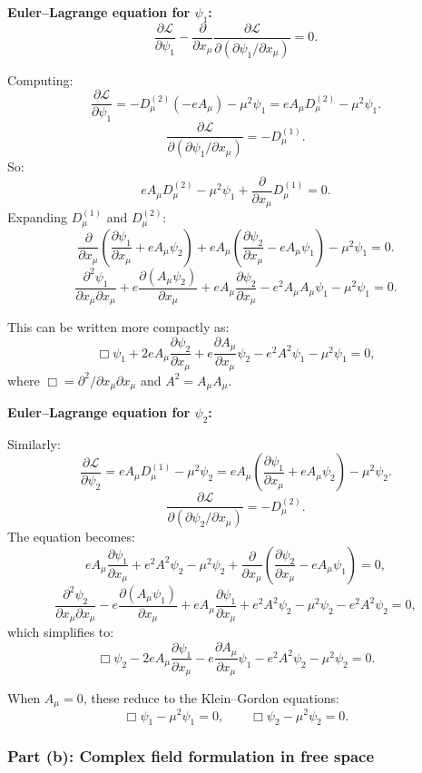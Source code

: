 \documentclass[12pt]{article}
\begin{document}
\medskip
\noindent\textbf{Euler--Lagrange equation for $\psi_1$:}
\[
  \frac{\partial\mathscr{L}}{\partial\psi_1} - \frac{\partial}{\partial x_\mu}\frac{\partial\mathscr{L}}{\partial(\partial\psi_1/\partial x_\mu)} = 0.
\]

Computing:
\[
  \frac{\partial\mathscr{L}}{\partial\psi_1} = -D_\mu^{(2)}(-eA_\mu) - \mu^2\psi_1 = eA_\mu D_\mu^{(2)} - \mu^2\psi_1.
\]
\[
  \frac{\partial\mathscr{L}}{\partial(\partial\psi_1/\partial x_\mu)} = -D_\mu^{(1)}.
\]
So:
\[
  eA_\mu D_\mu^{(2)} - \mu^2\psi_1 + \frac{\partial}{\partial x_\mu}D_\mu^{(1)} = 0.
\]
Expanding $D_\mu^{(1)}$ and $D_\mu^{(2)}$:
\[
  \frac{\partial}{\partial x_\mu}\left(\frac{\partial\psi_1}{\partial x_\mu} + eA_\mu\psi_2\right) + eA_\mu\left(\frac{\partial\psi_2}{\partial x_\mu} - eA_\mu\psi_1\right) - \mu^2\psi_1 = 0.
\]
\[
  \boxed{\frac{\partial^2\psi_1}{\partial x_\mu\partial x_\mu} + e\frac{\partial(A_\mu\psi_2)}{\partial x_\mu} + eA_\mu\frac{\partial\psi_2}{\partial x_\mu} - e^2 A_\mu A_\mu\psi_1 - \mu^2\psi_1 = 0.}
\]

This can be written more compactly as:
\[
  \Box\psi_1 + 2eA_\mu\frac{\partial\psi_2}{\partial x_\mu} + e\frac{\partial A_\mu}{\partial x_\mu}\psi_2 - e^2 A^2\psi_1 - \mu^2\psi_1 = 0,
\]
where $\Box = \partial^2/\partial x_\mu\partial x_\mu$ and $A^2 = A_\mu A_\mu$.

\medskip
\noindent\textbf{Euler--Lagrange equation for $\psi_2$:}

Similarly:
\[
  \frac{\partial\mathscr{L}}{\partial\psi_2} = eA_\mu D_\mu^{(1)} - \mu^2\psi_2 = eA_\mu\left(\frac{\partial\psi_1}{\partial x_\mu}+eA_\mu\psi_2\right) - \mu^2\psi_2.
\]
\[
  \frac{\partial\mathscr{L}}{\partial(\partial\psi_2/\partial x_\mu)} = -D_\mu^{(2)}.
\]
The equation becomes:
\[
  eA_\mu\frac{\partial\psi_1}{\partial x_\mu} + e^2 A^2\psi_2 - \mu^2\psi_2 + \frac{\partial}{\partial x_\mu}\left(\frac{\partial\psi_2}{\partial x_\mu} - eA_\mu\psi_1\right) = 0,
\]
\[
  \boxed{\frac{\partial^2\psi_2}{\partial x_\mu\partial x_\mu} - e\frac{\partial(A_\mu\psi_1)}{\partial x_\mu} + eA_\mu\frac{\partial\psi_1}{\partial x_\mu} + e^2 A^2\psi_2 - \mu^2\psi_2 - e^2 A^2\psi_2 = 0,}
\]
which simplifies to:
\[
  \Box\psi_2 - 2eA_\mu\frac{\partial\psi_1}{\partial x_\mu} - e\frac{\partial A_\mu}{\partial x_\mu}\psi_1 - e^2 A^2\psi_2 - \mu^2\psi_2 = 0.
\]

When $A_\mu = 0$, these reduce to the Klein--Gordon equations:
\[
  \Box\psi_1 - \mu^2\psi_1 = 0, \qquad \Box\psi_2 - \mu^2\psi_2 = 0.
\]

\subsubsection*{Part (b): Complex field formulation in free space}
\end{document}
